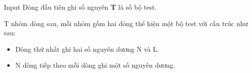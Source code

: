 Input
Dòng đầu tiên ghi số nguyên   \textbf{    T   }   là số bộ test.  

   T nhóm dòng sau, mỗi nhóm gồm hai dòng thể hiện một bộ test với cấu trúc như sau:   
\begin{itemize}
	\item     Dòng thứ nhất ghi hai số nguyên dương N và L.   
	\item     N dòng tiếp theo mỗi dòng ghi một số nguyên dương.   
\end{itemize}